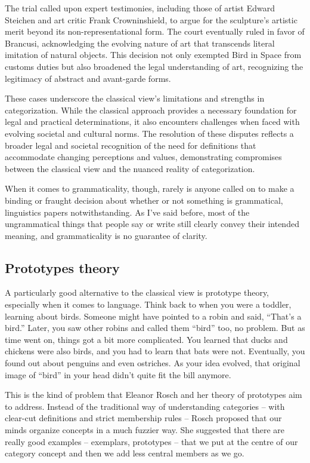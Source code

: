 The trial called upon expert testimonies, including those of artist Edward Steichen and art critic Frank Crowninshield, to argue for the sculpture's artistic merit beyond its non-representational form. The court eventually ruled in favor of Brancusi, acknowledging the evolving nature of art that transcends literal imitation of natural objects. This decision not only exempted Bird in Space from customs duties but also broadened the legal understanding of art, recognizing the legitimacy of abstract and avant-garde forms.

These cases underscore the classical view's limitations and strengths in categorization. While the classical approach provides a necessary foundation for legal and practical determinations, it also encounters challenges when faced with evolving societal and cultural norms. The resolution of these disputes reflects a broader legal and societal recognition of the need for definitions that accommodate changing perceptions and values, demonstrating compromises between the classical view and the nuanced reality of categorization.

When it comes to grammaticality, though, rarely is anyone called on to make a binding or fraught decision about whether or not something is grammatical, linguistics papers notwithstanding. As I've said before, most of the ungrammatical things that people say or write still clearly convey their intended meaning, and grammaticality is no guarantee of clarity.


\subsection{Prototypes theory}

A particularly good alternative to the classical view is prototype theory, especially when it comes to language. Think back to when you were a toddler, learning about birds. Someone might have pointed to a robin and said, ``That's a bird.'' Later, you saw other robins and called them ``bird'' too, no problem. But as time went on, things got a bit more complicated. You learned that ducks and chickens were also birds, and you had to learn that bats were not. Eventually, you found out about penguins and even ostriches. As your idea evolved, that original image of ``bird'' in your head didn't quite fit the bill anymore.

This is the kind of problem that Eleanor Rosch and her theory of prototypes aim to address. Instead of the traditional way of understanding categories -- with clear-cut definitions and strict membership rules -- Rosch proposed that our minds organize concepts in a much fuzzier way. She suggested that there are really good examples -- exemplars, prototypes -- that we put at the centre of our category concept and then we add less central members as we go.

